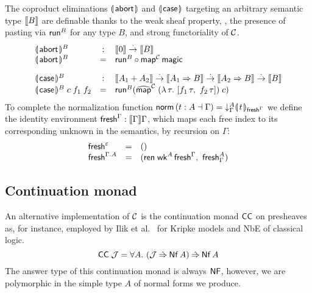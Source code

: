 \documentclass[a4paper,USenglish,cleveref, autoref]{lipics-v2019}
\begin{document}
The coproduct eliminations $\denabort$ and $\dencase$
targeting an arbitrary semantic type $\den B$ are definable thanks to
the weak sheaf property, \ie, the presence of pasting via $\trun^B$
for any type $B$, and strong functoriality of $\C$.
\[
\begin{array}{lcl}
  \denabort^B & : & \den \tyzero \todot \den B \\
  \denabort^B & = & \trun^B \comp \tmap[\C]\,\tmagic
\\[2ex]
  \dencase^B  & : & \den{A_1 + A_2}
    \todot \den{A_1 \To B}
    \todot \den{A_2 \To B}
    \todot \den{B} \\
  \dencase^B\;c\;f_1\;f_2 & = &
    \trun^B (\stmap[\C]\;(\lambda\,\tau.\ [f_1\,\tau,\ f_2\,\tau])\;c) \\
\end{array}
\]
To complete the normalization function
$\tnorm\,(t : A \from \Gamma) = \downG A \dent t {\idenv \Gamma}$
we define the identity environment $\idenv \Gamma : \den \Gamma \Gamma$,
which maps each free index to its corresponding unknown in the
semantics, by recursion on $\Gamma$:
\[
\begin{array}{lcl}
  \idenv \cempty & = & \ttempty \\
  \idenv {\cext \Gamma A} & = & (\tren\;\twk^A\,\idenv\Gamma, \  \tfresh^A_\Gamma)\\
\end{array}
\]

\subsection{Continuation monad}

An alternative implementation of $\C$ is the continuation monad $\CC$
on presheaves as, for instance, employed by Ilik et al.\
\cite{ilikLeeHerbelin:apal10}
for Kripke models and NbE of classical logic.
\[
  \CC\;\J = \forall A.\ (\J \hatto \tNf\,A) \hatto \tNf\,A
\]
The answer type of this continuation monad is always $\tNF$, however,
we are polymorphic in the simple type $A$ of normal forms we produce.
\end{document}
